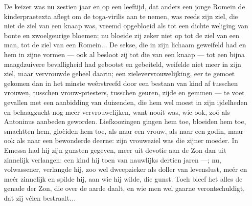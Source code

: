 \documentclass[a4paper, 12pt, oneside, dutch]{article}
\begin{document}
De keizer was nu zestien jaar en op een leeftijd, dat anders een jonge Romein de kinderpraetexta aflegt om de toga-virilis aan te nemen, was reeds zijn ziel, die niet de ziel van een knaap was, vreemd opgebloeid als tot een dichte weliging van bonte en zwoelgeurige bloemen; nu bloeide zij zeker niet op tot de ziel van een man, tot de ziel van een Romein... De sekse, die in zijn lichaam geweifeld had en hem in zijne vormen --- ook al besloot zij tot die van een knaap --- tot een bijna maagdzuivere bevalligheid had gebootst en gebeiteld, weifelde niet meer in zijn ziel, maar vervrouwde geheel daarin; een zielevervrouwelijking, eer te gemoet gekomen dan in het minste weêrstreefd door een bestaan van kind af tusschen vrouwen, tusschen vrouw-priesters, tusschen geuren, zijde en gemmen --- te voet gevallen met een aanbidding van duizenden, die hem wel moest in zijn ijdelheden en behaagzucht nog meer vervrouwelijken, want nooit was, wie ook, zoó als Antoninus aanbeden geworden. Liefkoozingen gingen hem toe, bloeiden hem toe, smachtten hem, gloèiden hem toe, als naar een vrouw, als naar een godin, maar ook als naar een bewonderde deerne: zijn vrouweziel was die zijner moeder. In Emessa had hij zijn gunsten gegeven, meer uit devotie aan de Zon dan uit zinnelijk verlangen: een kind hij toen van nauwlijks dertien jaren ---; nu, volwassener, verlangde hij, zoo wel dweepzieker als doller van levenslust, meér en meér zinnelijk en spilde hij, aan wie hij wilde, die gunst. Toch bleef het alles de genade der Zon, die over de aarde daalt, en wie men wel gaarne verontschuldigt, dat zij vélen bestraalt...
\end{document}
